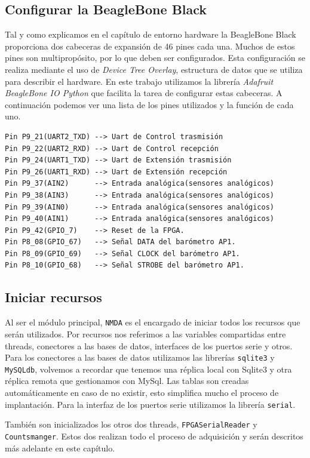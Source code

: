 	\subsection{Configurar la BeagleBone Black}
		Tal y como explicamos en el capítulo de entorno hardware la BeagleBone Black proporciona dos cabeceras de expansión de 46 pines cada
		una\cite{BeagleWikiExp}. Muchos de estos pines son multipropósito, por lo que deben ser configurados. Esta configuración se realiza
		mediante el uso de \emph{Device Tree Overlay}, estructura de datos que se utiliza para describir el hardware. En este trabajo
		utilizamos la librería \emph{Adafruit BeagleBone IO Python}\cite{AdaFruitGit} que facilita la tarea de configurar estas cabeceras. A
		continuación podemos ver una lista de los pines utilizados y la función de cada uno.
		\begin{lstlisting}[style=myBash]
Pin P9_21(UART2_TXD) --> Uart de Control trasmisión
Pin P9_22(UART2_RXD) --> Uart de Control recepción
Pin P9_24(UART1_TXD) --> Uart de Extensión trasmisión
Pin P9_26(UART1_RXD) --> Uart de Extensión recepción
Pin P9_37(AIN2)	     --> Entrada analógica(sensores analógicos)
Pin P9_38(AIN3)	     --> Entrada analógica(sensores analógicos)
Pin P9_39(AIN0)	     --> Entrada analógica(sensores analógicos)
Pin P9_40(AIN1)	     --> Entrada analógica(sensores analógicos)
Pin P9_42(GPIO_7)    --> Reset de la FPGA.
Pin P8_08(GPIO_67)   --> Señal DATA del barómetro AP1.
Pin P8_09(GPIO_69)   --> Señal CLOCK del barómetro AP1.
Pin P8_10(GPIO_68)   --> Señal STROBE del barómetro AP1.
		\end{lstlisting}

	\subsection{Iniciar recursos}
		Al ser el módulo principal, \texttt{NMDA} es el encargado de iniciar todos los recursos que serán utilizados. Por recursos nos
		referimos a las variables compartidas entre threads, conectores a las bases de datos, interfaces de los puertos serie y otros. Para
		los conectores a las bases de datos utilizamos las librerías \texttt{sqlite3} y \texttt{MySQLdb}, volvemos a recordar que tenemos una
		réplica local con Sqlite3 y otra réplica remota que gestionamos con MySql. Las tablas son creadas automáticamente en caso de no
		existir, esto simplifica mucho el proceso de implantación. Para la interfaz de los puertos serie utilizamos la librería
		\texttt{serial}.
		\par
		También son inicializados los otros dos threads, \texttt{FPGASerialReader} y \texttt{Countsmanger}. Estos dos realizan todo el proceso
		de adquisición y serán descritos más adelante en este capítulo. 

